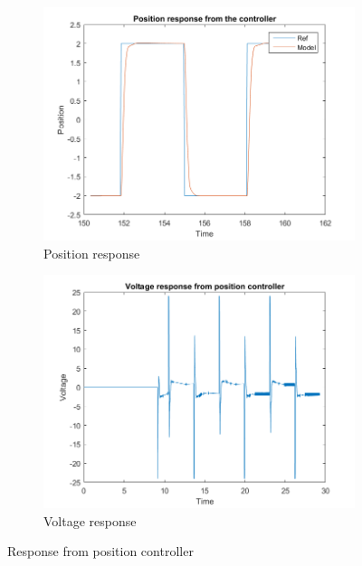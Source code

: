 \documentclass[12pt,a4paper]{article}
\begin{document}
\begin{figure}[H]
  \centering
  \begin{subfigure}[b]{0.45\linewidth}
    \includegraphics[width=\linewidth]{PosCont.png}
    \caption{Position response}
    \label{fig:pos_cont:a}
  \end{subfigure}
  \begin{subfigure}[b]{0.45\linewidth}
    \includegraphics[width=\linewidth]{PosCont_V.png}
    \caption{Voltage response}
    \label{fig:pos_cont:b}
  \end{subfigure}
  \caption{Response from position controller}
  \label{fig:pos_cont}
\end{figure}
\end{document}
